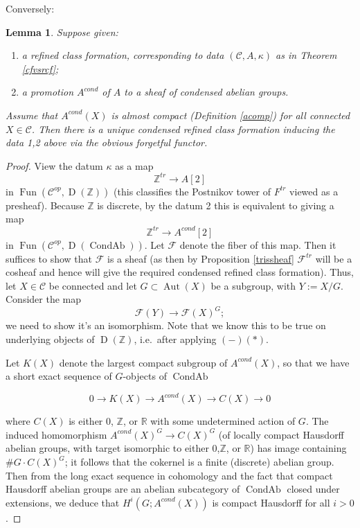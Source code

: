 \documentclass[12pt]{article}
\newtheorem{lemma}[theorem]{Lemma}
\theoremstyle{definition}
\newcommand{\on}{\operatorname}
\newcommand{\mc}{\mathcal}
\newcommand{\mbb}{\mathbb}
\begin{document}
Conversely:

\begin{lemma}\label{condautomatic}
Suppose given:
\begin{enumerate}
\item a refined class formation, corresponding to data $(\mc{C},A,\kappa)$ as in Theorem \ref{cfvsrcf};
\item a promotion $A^{cond}$ of $A$ to a sheaf of condensed abelian groups.
\end{enumerate}

Assume that $A^{cond}(X)$ is almost compact (Definition \ref{acomp}) for all connected $X\in\mc{C}$.  Then there is a unique condensed refined class formation inducing the data 1,2 above via the obvious forgetful functor.
\end{lemma}
\begin{proof}
View the datum $\kappa$ as a map
$$\mbb{Z}^{tr} \to A[2]$$
in $\on{Fun}(\mc{C}^{op},\on{D}(\mbb{Z}))$ (this classifies the Postnikov tower of $F^{tr}$ viewed as a presheaf).  Because $\mbb{Z}$ is discrete, by the datum 2 this is equivalent to giving a map
$$\mbb{Z}^{tr} \to A^{cond}[2]$$
in $\on{Fun}(\mc{C}^{op},\on{D}(\on{CondAb}))$.  Let $\mathcal{F}$ denote the fiber of this map.  Then it suffices to show that $\mc{F}$ is a sheaf (as then by Proposition \ref{trissheaf} $\mc{F}^{tr}$ will be a cosheaf and hence will give the required condensed refined class formation).  Thus, let $X\in\mc{C}$ be connected and let $G\subset\on{Aut}(X)$ be a subgroup, with $Y:=X/G$.  Consider the map
$$\mc{F}(Y) \to \mc{F}(X)^G;$$
we need to show it's an isomorphism.  Note that we know this to be true on underlying objects of $\on{D}(\mbb{Z})$, i.e.\ after applying $(-)(\ast)$.

Let $K(X)$ denote the largest compact subgroup of $A^{cond}(X)$, so that we have a short exact sequence of $G$-objects of $\on{CondAb}$

$$0 \to K(X) \to A^{cond}(X) \to C(X)\to 0$$

\noindent where $C(X)$ is either $0$, $\mbb{Z}$, or $\mbb{R}$ with some undetermined action of $G$.  The induced homomorphism $A^{cond}(X)^G \to C(X)^G$ (of locally compact Hausdorff abelian groups, with target isomorphic to either $0$,$\mbb{Z}$, or $\mbb{R}$) has image containing $\#G\cdot C(X)^G$; it follows that the cokernel is a finite (discrete) abelian group.  Then from the long exact sequence in cohomology and the fact that compact Hausdorff abelian groups are an abelian subcategory of $\on{CondAb}$ closed under extensions, we deduce that $H^i(G;A^{cond}(X))$ is compact Hausdorff for all $i>0$.


\end{proof}
\end{document}

